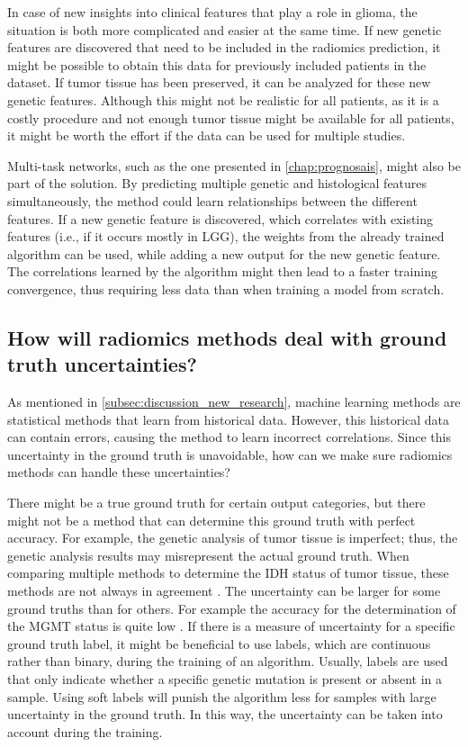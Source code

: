 In case of new insights into clinical features that play a role in glioma, the situation is both more complicated and easier at the same time.
If new genetic features are discovered that need to be included in the radiomics prediction, it might be possible to obtain this data for previously included patients in the dataset.
If \gls{tumor} tissue has been preserved, it can be analyzed for these new genetic features.
Although this might not be realistic for all patients, as it is a costly procedure and not enough \gls{tumor} tissue might be available for all patients, it might be worth the effort if the data can be used for multiple studies.

Multi-task networks, such as the one presented in \cref{chap:prognosais}, might also be part of the solution.
By predicting multiple genetic and histological features simultaneously, the method could learn relationships between the different features.
If a new genetic feature is discovered, which correlates with existing features (i.e., if it occurs mostly in \gls{LGG}), the weights from the already trained algorithm can be used, while adding a new output for the new genetic feature.
The correlations learned by the algorithm might then lead to a faster training convergence, thus requiring less data than when training a model from scratch.

\subsection{How will radiomics methods deal with ground truth uncertainties?}

As mentioned in \cref{subsec:discussion_new_research}, machine learning methods are statistical methods that learn from historical data.
However, this historical data can contain errors, causing the method to learn incorrect correlations.
Since this uncertainty in the ground truth is unavoidable, how can we make sure radiomics methods can handle these uncertainties?

There might be a true ground truth for certain output categories, but there might not be a method that can determine this ground truth with perfect accuracy.
For example, the genetic analysis of \gls{tumor} tissue is imperfect; thus, the genetic analysis results may misrepresent the actual ground truth.
When comparing multiple methods to determine the \gls{IDH} status of \gls{tumor} tissue, these methods are not always in agreement \autocite{pyo2016concordance}.
The uncertainty can be larger for some ground truths than for others.
For example the accuracy for the determination of the \gls{MGMT} status is quite low \autocite{wang2017mgmt}.
If there is a measure of uncertainty for a specific ground truth label, it might be beneficial to use  labels, which are continuous rather than binary, during the training of an algorithm.
Usually, labels are used that only indicate whether a specific genetic mutation is present or absent in a sample.
Using soft labels will punish the algorithm less for samples with large uncertainty in the ground truth.
In this way, the uncertainty can be taken into account during the training.


